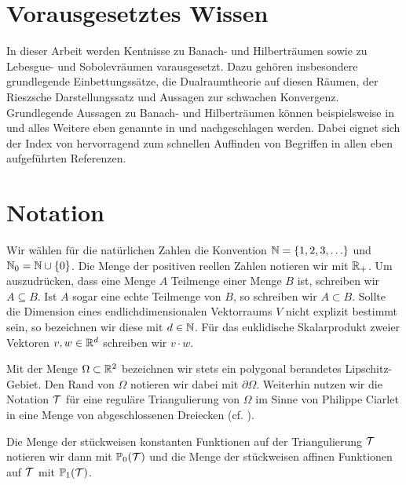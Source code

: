 \section{Vorausgesetztes Wissen}
In dieser Arbeit werden Kentnisse zu Banach- und Hilberträumen
sowie zu Lebesgue- und Sobolevräumen varausgesetzt. Dazu gehören insbesondere
grundlegende Einbettungssätze, die Dualraumtheorie auf diesen Räumen, der
Rieszsche Darstellungssatz und Aussagen zur schwachen Konvergenz.
Grundlegende Aussagen zu Banach- und Hilberträumen können beispielsweise
in \cite{Zei86} und alles Weitere eben genannte in \cite{Zei90a} und
\cite{Zei90b} nachgeschlagen werden. Dabei eignet sich der Index von
\cite{Zei90b} hervorragend zum schnellen Auffinden von Begriffen in allen eben
aufgeführten Referenzen.



\section{Notation}
Wir wählen für die natürlichen Zahlen die Konvention
$\mathbb{N}=\{1,2,3,\ldots\}$ und $\mathbb{N}_0=\mathbb{N}\cup\{0\}$. 
Die Menge der positiven reellen Zahlen notieren wir mit $\mathbb{R}_+$.
Um auszudrücken, dass eine Menge $A$ Teilmenge einer Menge $B$ ist, 
schreiben wir $A\subseteq B$. Ist $A$ sogar eine echte Teilmenge von $B$, so 
schreiben wir $A\subset B$.
Sollte die Dimension eines endlichdimensionalen Vektorraums $V$
nicht explizit bestimmt sein, so bezeichnen wir diese mit $d\in\mathbb{N}$.
Für das euklidische Skalarprodukt zweier Vektoren $v,w\in \mathbb{R}^d$ schreiben wir
$v\cdot w$.


Mit der Menge $\Omega\subset\mathbb{R}^2$ bezeichnen wir stets ein polygonal
berandetes Lipschitz-Gebiet. Den Rand von $\Omega$ notieren wir dabei mit
$\partial\Omega$.
Weiterhin nutzen wir die Notation $\mathcal{T}$ für eine reguläre Triangulierung von
$\Omega$ im Sinne von Philippe Ciarlet in eine Menge von abgeschlossenen
Dreiecken (cf. \cite[Kapitel 1.3.1]{Car09b}).

Die Menge der stückweisen konstanten Funktionen auf der Triangulierung $\mathcal{T}$
notieren wir dann mit $\mathbb{P}_0(\mathcal{T})$ und die Menge der stückweisen affinen
Funktionen auf $\mathcal{T}$ mit $\mathbb{P}_1(\mathcal{T})$.

